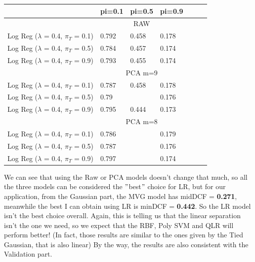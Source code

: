 \documentclass[english]{report}
\begin{document}
\begin{table}[H]
    \centering
    \begin{tabular}{lllllll}
        \toprule
                                & pi=0.1 & pi=0.5 & pi=0.9 \\ \midrule
                                & \multicolumn{3}{c}{RAW}  \\
    Log Reg ($\lambda$ = 0.4, $\pi_T$ = 0.1)   & 0.792      & 0.458      & 0.178      \\
    Log Reg ($\lambda$ = 0.4, $\pi_T$ = 0.5)   & 0.784      & 0.457      & 0.174       \\
    Log Reg ($\lambda$ = 0.4, $\pi_T$ = 0.9)   & 0.793      & 0.455      & 0.174      \\ \midrule
                                & \multicolumn{3}{c}{PCA m=9}  \\
    Log Reg ($\lambda$ = 0.4, $\pi_T$ = 0.1)   & 0.787      & 0.458       & 0.178       \\
    Log Reg ($\lambda$ = 0.4, $\pi_T$ = 0.5)   & 0.79       & \color{red}{0.452}      & 0.176      \\
    Log Reg ($\lambda$ = 0.4, $\pi_T$ = 0.9)   & 0.795      & 0.444      & 0.173      \\ \midrule
                                & \multicolumn{3}{c}{PCA m=8}  \\
    Log Reg ($\lambda$ = 0.4, $\pi_T$ = 0.1)   & 0.786      & \color{red}{0.457}       & 0.179       \\
    Log Reg ($\lambda$ = 0.4, $\pi_T$ = 0.5)   & 0.787      & \color{red}{0.452}      & 0.176      \\
    Log Reg ($\lambda$ = 0.4, $\pi_T$ = 0.9)   & 0.797      & \color{red}{0.442}      & 0.174      \\
    \bottomrule
    \end{tabular}
    \label{tab:LogReg_eval}
\end{table}
We can see that using the Raw or PCA models doesn't change that much, so all the three models can be considered the \("\)best\("\) choice
for LR, but for our application, from the Gaussian part, the MVG model has midDCF = \textbf{0.271}, meanwhile the best I can obtain using LR is minDCF = \textbf{0.442}.
So the LR model isn't the best choice overall.
Again, this is telling us that the linear separation isn't the one we need,
so we expect that the RBF, Poly SVM and QLR will perform better!
(In fact, those results are similar to the ones given by the Tied Gaussian, that is also linear)
By the way, the results are also consistent with the Validation part.
\end{document}
